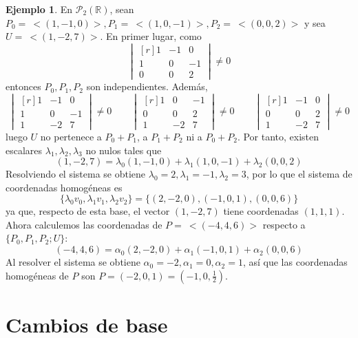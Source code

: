 \documentclass[12pt]{report}
\theoremstyle{definition}
\theoremstyle{definition}
\newtheorem{example}{Ejemplo}[chapter]
\theoremstyle{remark}
\newcommand{\R}{\mathbb R}
\begin{document}
\begin{example}
En $\mathcal{P}_2(\R)$, sean $P_0 = \ <(1,-1,0)>, P_1 = \ <(1,0,-1)>, P_2 = \ <(0,0,2)>$ y sea $U = \ <(1,-2,7)>$. En primer lugar, como
\[\begin{vmatrix*}[r]
1 & -1 & 0 \\
1 & 0 & -1 \\
0 & 0 & 2
\end{vmatrix*} \neq 0\]
entonces $P_0, P_1, P_2$ son independientes. Además, 
\[\begin{vmatrix*}[r]
1 & -1 & 0 \\
1 & 0 & -1 \\
1 & -2 & 7
\end{vmatrix*} \neq 0 \qquad
\begin{vmatrix*}[r]
1 & 0 & -1 \\
0 & 0 & 2 \\
1 & -2 & 7
\end{vmatrix*} \neq 0 \qquad
\begin{vmatrix*}[r]
1 & -1 & 0 \\
0 & 0 & 2 \\
1 & -2 & 7
\end{vmatrix*} \neq 0\]
luego $U$ no pertenece a $P_0+P_1$, a $P_1+P_2$ ni a $P_0+P_2$. Por tanto, existen escalares $\lambda_1, \lambda_2, \lambda_3$ no nulos tales que
\[(1,-2,7) = \lambda_0(1,-1,0) + \lambda_1(1,0,-1)+\lambda_2(0,0,2)\]
Resolviendo el sistema se obtiene $\lambda_0 = 2,\lambda_1 = -1,\lambda_2 = 3$, por lo que el sistema de coordenadas homogéneas es
\[\{\lambda_0v_0,\lambda_1v_1,\lambda_2v_2\} = \{(2,-2,0),(-1,0,1),(0,0,6)\}\]
ya que, respecto de esta base, el vector $(1,-2,7)$ tiene coordenadas $(1,1,1)$. Ahora calculemos las coordenadas de $P = \ <(-4,4,6)>$ respecto a $\{P_0,P_1,P_2;U\}$:
\[(-4,4,6) = \alpha_0(2,-2,0)+\alpha_1(-1,0,1)+\alpha_2(0,0,6)\]
Al resolver el sistema se obtiene $\alpha_0 = -2, \alpha_1 = 0, \alpha_2 = 1$, así que las coordenadas homogéneas de $P$ son $P = (-2,0,1) = (-1,0,\frac{1}{2})$.
\end{example}

\section{Cambios de base}
\end{document}
